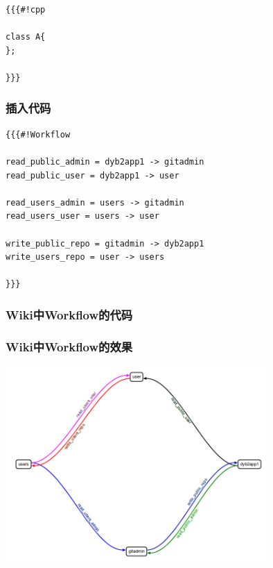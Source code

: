 \newsavebox{\TracWikiCode}
\begin{lrbox}{\TracWikiCode}
\begin{lstlisting}
{{{#!cpp

class A{
};

}}}
\end{lstlisting}
\end{lrbox}

\begin{frame}
    \frametitle{插入代码}
    \par\usebox{\TracWikiCode}
\end{frame}

\newsavebox{\TracWikiWorkflow}
\begin{lrbox}{\TracWikiWorkflow}
\begin{lstlisting}
{{{#!Workflow

read_public_admin = dyb2app1 -> gitadmin
read_public_user = dyb2app1 -> user

read_users_admin = users -> gitadmin
read_users_user = users -> user

write_public_repo = gitadmin -> dyb2app1
write_users_repo = user -> users

}}}
\end{lstlisting}
\end{lrbox}

\begin{frame}
    \frametitle{Wiki中Workflow的代码}
    \par\usebox{\TracWikiWorkflow}
\end{frame}

\begin{frame}
    \frametitle{Wiki中Workflow的效果}
    \includegraphics[width=10cm,keepaspectratio]{data/TracWorkflow.png}
\end{frame}

